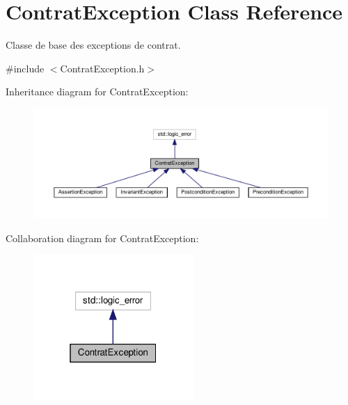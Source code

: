 \hypertarget{classContratException}{}\section{Contrat\+Exception Class Reference}
\label{classContratException}


Classe de base des exceptions de contrat.  




{\ttfamily \#include $<$Contrat\+Exception.\+h$>$}



Inheritance diagram for Contrat\+Exception\+:\nopagebreak
\begin{figure}[H]
\begin{center}
\leavevmode
\includegraphics[width=350pt]{classContratException__inherit__graph}
\end{center}
\end{figure}


Collaboration diagram for Contrat\+Exception\+:\nopagebreak
\begin{figure}[H]
\begin{center}
\leavevmode
\includegraphics[width=172pt]{classContratException__coll__graph}
\end{center}
\end{figure}
